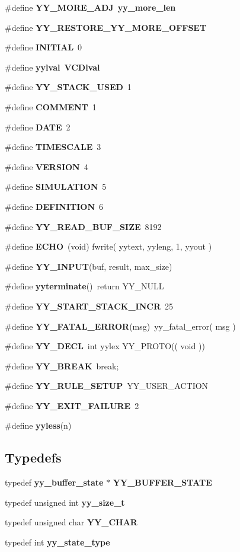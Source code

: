 \begin{CompactItemize}
\#define {\bf YY\_\-MORE\_\-ADJ}\ {\bf yy\_\-more\_\-len}
\item 
\#define {\bf YY\_\-RESTORE\_\-YY\_\-MORE\_\-OFFSET}
\item 
\#define {\bf INITIAL}\ 0
\item 
\#define {\bf yylval}\ {\bf VCDlval}
\item 
\#define {\bf YY\_\-STACK\_\-USED}\ 1
\item 
\#define {\bf COMMENT}\ 1
\item 
\#define {\bf DATE}\ 2
\item 
\#define {\bf TIMESCALE}\ 3
\item 
\#define {\bf VERSION}\ 4
\item 
\#define {\bf SIMULATION}\ 5
\item 
\#define {\bf DEFINITION}\ 6
\item 
\#define {\bf YY\_\-READ\_\-BUF\_\-SIZE}\ 8192
\item 
\#define {\bf ECHO}\ (void) fwrite( yytext, yyleng, 1, yyout )
\item 
\#define {\bf YY\_\-INPUT}(buf, result, max\_\-size)
\item 
\#define {\bf yyterminate}()\ return YY\_\-NULL
\item 
\#define {\bf YY\_\-START\_\-STACK\_\-INCR}\ 25
\item 
\#define {\bf YY\_\-FATAL\_\-ERROR}(msg)\ yy\_\-fatal\_\-error( msg )
\item 
\#define {\bf YY\_\-DECL}\ int yylex YY\_\-PROTO(( void ))
\item 
\#define {\bf YY\_\-BREAK}\ break;
\item 
\#define {\bf YY\_\-RULE\_\-SETUP}\ YY\_\-USER\_\-ACTION
\item 
\#define {\bf YY\_\-EXIT\_\-FAILURE}\ 2
\item 
\#define {\bf yyless}(n)
\end{CompactItemize}
\subsection*{Typedefs}
\begin{CompactItemize}
\item 
typedef {\bf yy\_\-buffer\_\-state} $\ast$ {\bf YY\_\-BUFFER\_\-STATE}
\item 
typedef unsigned int {\bf yy\_\-size\_\-t}
\item 
typedef unsigned char {\bf YY\_\-CHAR}
\item 
typedef int {\bf yy\_\-state\_\-type}
\end{CompactItemize}
